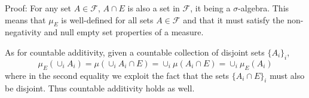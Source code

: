 \documentclass[10pt]{article}
\begin{document}
  Proof: For any set $A \in \mathcal{F}$, $A \cap E$
  is also a set in $\mathcal{F}$, it being a $\sigma$-algebra.
  This means that $\mu_E$ is well-defined for all sets $A \in \mathcal{F}$
  and that it must satisfy the non-negativity and null empty set
  properties of a measure.

  As for countable additivity, 
  given a countable collection of disjoint sets $\{A_i\}_i$,
  \begin{equation*}
    \mu_E(\cup_i A_i) = \mu(\cup_i A_i \cap E) = \cup_i \mu(A_i \cap E)
    = \cup_i \mu_E(A_i)
  \end{equation*}
  where in the second equality we exploit the fact that the sets
  $\{A_i \cap E\}_i$ must also be disjoint. 
  Thus countable additivity holds as well.
\end{document}

